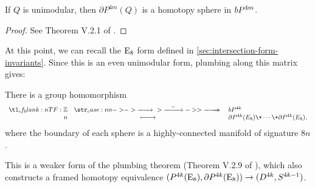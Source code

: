 \begin{theorem}
	If $Q$ is unimodular, then $\partial P^{4m}(Q)$ is a homotopy sphere in $bP^{4m}$.
\end{theorem}
\begin{proof}
	See Theorem V.2.1 of \cite{browder1972surgery}.
\end{proof}

At this point, we can recall the $\mathrm{E}_8$ form defined in \cref{sec:intersection-form-invariants}. Since this is an even unimodular form, plumbing along this matrix gives:
\begin{theorem}\label{thm:plumbing-theorem}
	There is a group homomorphism
	\[
		\lkxfunc{}{\Z}{\bP^{4k}}{n}{\partial P^{4k}(E_8)\+\cdots\+\partial P^{4k}(E_8),}
	\]
	where the boundary of each sphere is a highly-connected manifold of signature $8n$.
\end{theorem}

This is a weaker form of the plumbing theorem (Theorem V.2.9 of \cite{browder1972surgery}), which also constructs a framed homotopy equivalence $(P^{4k}(\mathrm{E}_8), \partial P^{4k}(\mathrm{E}_8)) \to (D^{4k}, S^{4k-1})$.


